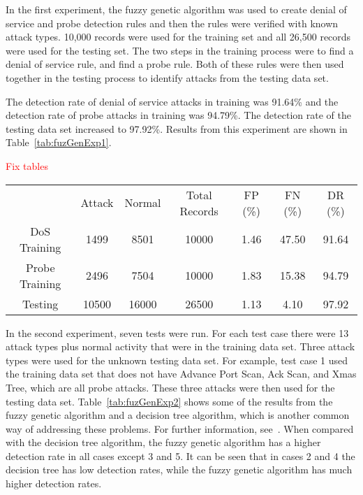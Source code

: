 \documentclass{sig-alternate}
\newcommand{\mycomment}[1]{\textcolor{red}{#1}}
\begin{document}
In the first experiment, the fuzzy genetic algorithm was used to create denial of service and probe detection rules and then the rules were verified with known attack types. 10,000 records were used for the training set and all 26,500 records were used for the testing set. The two steps in the training process were to find a denial of service rule, and find a probe rule. Both of these rules were then used together in the testing process to identify attacks from the testing data set.

The detection rate of denial of service attacks in training was 91.64\% and the detection rate of probe attacks in training was 94.79\%. The detection rate of the testing data set increased to 97.92\%. Results from this experiment are shown in Table~\ref{tab:fuzGenExp1}.

\mycomment{Fix tables}

\begin{table*}
\center
\caption{Results from Experiment 1}
\begin{tabular}{ccccccc}
 & Attack & Normal & Total Records & FP (\%) & FN (\%) & DR (\%)\\
DoS Training & 1499 & 8501 & 10000 & 1.46 & 47.50 & 91.64\\
Probe Training & 2496 & 7504 & 10000 & 1.83 & 15.38 & 94.79\\
Testing & 10500 & 16000 & 26500 & 1.13 & 4.10 & 97.92\\
\end{tabular}
\label{tab:fuzGenExp1}
\center
\end{table*}

In the second experiment, seven tests were run. For each test case there were 13 attack types plus normal activity that were in the training data set. Three attack types were used for the unknown testing data set. For example, test case 1 used the training data set that does not have Advance Port Scan, Ack Scan, and Xmas Tree, which are all probe attacks. These three attacks were then used for the testing data set. Table~\ref{tab:fuzGenExp2} shows some of the results from the fuzzy genetic algorithm and a decision tree algorithm, which is another common way of addressing these problems. For further information, see~\cite{decisionTree}. When compared with the decision tree algorithm, the fuzzy genetic algorithm has a higher detection rate in all cases except 3 and 5. It can be seen that in cases 2 and 4 the decision tree has low detection rates, while the fuzzy genetic algorithm has much higher detection rates.
\end{document}
